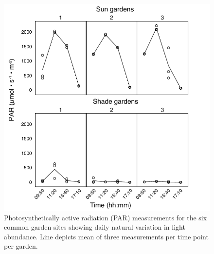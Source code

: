 \documentclass[11pt, oneside]{amsart}
\begin{document}
\begin{figure}[!htbp]
\centering
\includegraphics[scale=0.75]{par}
\caption{Photosynthetically active radiation (PAR) measurements for the six common garden sites showing daily natural variation in light abundance. Line depicts mean of three measurements per time point per garden.}
\label{par}
\end{figure}

\clearpage
\end{document}
